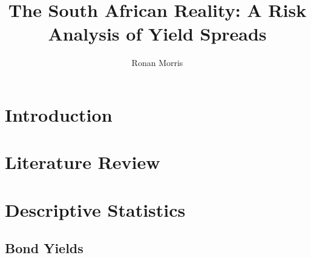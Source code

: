 \documentclass[11pt,preprint, authoryear]{elsarticle}
\numberwithin{equation}{section}
\numberwithin{figure}{section}
\numberwithin{table}{section}
\begin{document}
\begin{frontmatter}  %

\title{The South African Reality: A Risk Analysis of Yield Spreads}





\author[Add1]{Ronan Morris}





\address[Add1]{Stellenbosch University}



\vspace{1cm}





\vspace{0.5cm}

\end{frontmatter}

\setcounter{footnote}{0}



\pagestyle{fancy}
\chead{}
\rhead{}
\lfoot{}
\lhead{}
\cfoot{}


\headsep 35pt %




\hypertarget{introduction}{%
\section{Introduction}\label{introduction}}

\hypertarget{literature-review}{%
\section{Literature Review}\label{literature-review}}

\hypertarget{descriptive-statistics}{%
\section{Descriptive Statistics}\label{descriptive-statistics}}

\hypertarget{bond-yields}{%
\subsection{Bond Yields}\label{bond-yields}}
\end{document}
